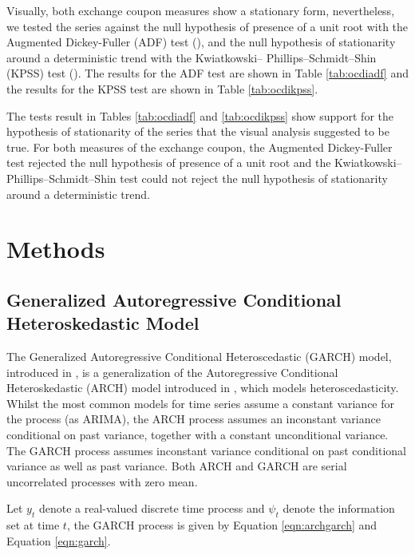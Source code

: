 \documentclass[cic,tc, english]{iiufrgs}
\begin{document}
    

    

    Visually, both exchange coupon measures show a stationary form, nevertheless, we tested the series against the null hypothesis of presence of a unit root with the Augmented Dickey-Fuller (ADF) test (\citet{adf}), and the null hypothesis of stationarity around a deterministic trend with the Kwiatkowski– Phillips–Schmidt–Shin (KPSS) test (\citet{kpss}). The results for the ADF test are shown in Table \ref{tab:ocdiadf} and the results for the KPSS test are shown in Table \ref{tab:ocdikpss}.

    

    

    The tests result in Tables \ref{tab:ocdiadf} and \ref{tab:ocdikpss} show support for the hypothesis of stationarity of the series that the visual analysis suggested to be true. For both measures of the exchange coupon, the Augmented Dickey-Fuller test rejected the null hypothesis of presence of a unit root and the Kwiatkowski– Phillips–Schmidt–Shin test could not reject the null hypothesis of stationarity around a deterministic trend.

\section{Methods} \label{chapter_methods}

\subsection{Generalized Autoregressive Conditional Heteroskedastic Model}

    The Generalized Autoregressive Conditional Heteroscedastic (GARCH) model, introduced in \citet{bollerslev1986}, is a generalization of the Autoregressive Conditional Heteroskedastic (ARCH) model introduced in \citet{engle1982}, which models heteroscedasticity. Whilst the most common models for time series assume a constant variance for the process (as ARIMA), the ARCH process assumes an inconstant variance conditional on past variance, together with a constant unconditional variance. The GARCH process assumes inconstant variance conditional on past conditional variance as well as past variance. Both ARCH and GARCH are serial uncorrelated processes with zero mean.

    Let $y_t$ denote a real-valued discrete time process and $\psi_t$ denote the information set at time $t$,  the GARCH process is given by Equation \ref{eqn:archgarch} and Equation \ref{eqn:garch}.
\end{document}

